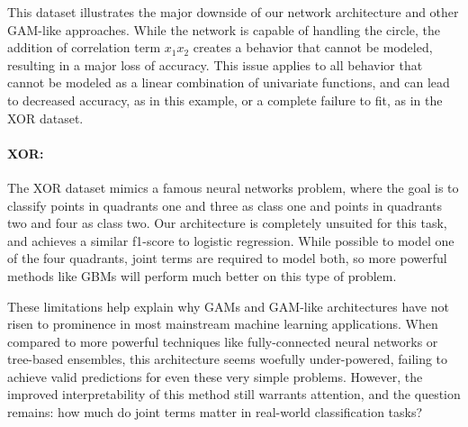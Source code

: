 This dataset illustrates the major downside of our network architecture and other GAM-like approaches. While the network is capable of handling the circle, the addition of correlation term $x_1 x_2$ creates a behavior that cannot be modeled, resulting in a major loss of accuracy. This issue applies to all behavior that cannot be modeled as a linear combination of univariate functions, and can lead to decreased accuracy, as in this example, or a complete failure to fit, as in the XOR dataset. 


\paragraph{XOR:} The XOR dataset mimics a famous neural networks problem, where the goal is to classify points in quadrants one and three as class one and points in quadrants two and four as class two. Our architecture is completely unsuited for this task, and achieves a similar f1-score to logistic regression. While possible to model one of the four quadrants, joint terms are required to model both, so more powerful methods like GBMs will perform much better on this type of problem.

These limitations help explain why GAMs and GAM-like architectures have not risen to prominence in most mainstream machine learning applications. When compared to more powerful techniques like fully-connected neural networks or tree-based ensembles, this architecture seems woefully under-powered, failing to achieve valid predictions for even these very simple problems. However, the improved interpretability of this method still warrants attention, and the question remains: how much do joint terms matter in real-world classification tasks? 
